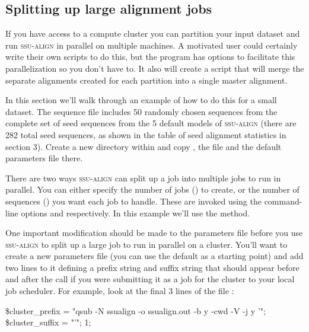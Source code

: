 \subsection{Splitting up large alignment jobs}

If you have access to a compute cluster you can partition your input
dataset and run \textsc{ssu-align} in parallel on multiple machines. A
motivated user could certainly write their own scripts to do this, but
the  program has options to facilitate this
parallelization so you don't have to.  It also will create a script
that will merge the separate alignments created for each partition
into a single master alignment.

In this section we'll walk through an example of how to do this for a
small dataset.  The sequence file  includes
50 randomly chosen sequences from the complete set of seed sequences
from the 5 default models of \textsc{ssu-align} (there are 282 total
seed sequences, as shown in the table of seed alignment statistics in
section 3). Create a new directory within  and copy
, the file
 and the default parameters file
 there.

There are two ways \textsc{ssu-align} can split up a job into multiple
jobs to run in parallel. You can either specify the number of jobs
() to create, or the number of sequences () you
want each job to handle. These are invoked using the command-line
options  and  respectively.  In this example
we'll use the  method.

One important modification should be made to the parameters file
before you use \textsc{ssu-align} to split up a large job to run in
parallel on a cluster. You'll want to create a new parameters file
(you can use the default  as a starting point) and
add two lines to it defining a prefix string and suffix string that
should appear before and after the  call if you were
submitting it as a job for the cluster to your local job
scheduler. For example, look at the final 3 lines of the file
:

\begin{sreoutput}
\$cluster\_prefix = "qsub -N ssualign -o ssualign.out -b y -cwd -V -j y '";
\$cluster\_suffix = "'";
1;
\end{sreoutput}

